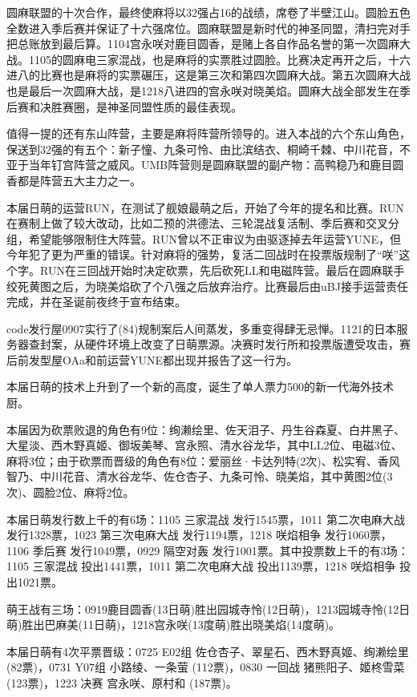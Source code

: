 圆麻联盟的十次合作，最终使麻将以32强占16的战绩，席卷了半壁江山。圆脸五色全数进入季后赛并保证了十六强席位。圆麻联盟是新时代的神圣同盟，清扫完对手把总账放到最后算。1104宫永咲对鹿目圆香，是赌上各自作品名誉的第一次圆麻大战。1105的圆麻电三家混战，也是麻将的实票胜过圆脸。比赛决定再开之后，十六进八的比赛也是麻将的实票碾压，这是第三次和第四次圆麻大战。第五次圆麻大战也是最后一次圆麻大战，是1218八进四的宫永咲对晓美焰。圆麻大战全部发生在季后赛和决胜赛圈，是神圣同盟性质的最佳表现。

值得一提的还有东山阵营，主要是麻将阵营所领导的。进入本战的六个东山角色，保送到32强的有五个：新子憧、九条可怜、由比滨结衣、桐崎千棘、中川花音，不亚于当年钉宫阵营之威风。UMB阵营则是圆麻联盟的副产物：高鸭稳乃和鹿目圆香都是阵营五大主力之一。

本届日萌的运营RUN，在测试了舰娘最萌之后，开始了今年的提名和比赛。RUN在赛制上做了较大改动，比如二预的洪德法、三轮混战复活制、季后赛和交叉分组，希望能够限制住大阵营。RUN曾以不正审议为由驱逐掉去年运营YUNE，但今年犯了更为严重的错误。针对麻将的强势，复活二回战时在投票版规制了“咲”这个字。RUN在三回战开始时决定砍票，先后砍死LL和电磁阵营。最后在圆麻联手绞死黄图之后，为晓美焰砍了个八强之后放弃治疗。比赛最后由uBJ接手运营责任完成，并在圣诞前夜终于宣布结束。

code发行屋0907实行了(84)规制案后人间蒸发，多重变得肆无忌惮。1121的日本服务器查封案，从硬件环境上改变了日萌票源。决赛时发行所和投票版遭受攻击，赛后前发型屋OAa和前运营YUNE都出现并报告了这一行为。

本届日萌的技术上升到了一个新的高度，诞生了单人票力500的新一代海外技术厨。

本届因为砍票败退的角色有9位：绚濑绘里、佐天泪子、丹生谷森夏、白井黑子、大星淡、西木野真姬、御坂美琴、宫永照、清水谷龙华，其中LL2位、电磁3位、麻将3位；由于砍票而晋级的角色有8位：爱丽丝·卡达列特(2次)、松实宥、香风智乃、中川花音、清水谷龙华、佐仓杏子、九条可怜、晓美焰，其中黄图2位(3次)、圆脸2位、麻将2位。

本届日萌发行数上千的有6场：1105 三家混战 发行1545票，1011 第二次电麻大战 发行1328票，1023 第三次电麻大战 发行1194票，1218 咲焰相争 发行1060票，1106 季后赛 发行1049票，0929 隔空对轰 发行1001票。其中投票数上千的有3场：1105 三家混战 投出1441票，1011 第二次电麻大战 投出1139票，1218 咲焰相争 投出1021票。

萌王战有三场：0919鹿目圆香(13日萌)胜出园城寺怜(12日萌)，1213园城寺怜(12日萌)胜出巴麻美(11日萌)，1218宫永咲(13度萌)胜出晓美焰(14度萌)。

本届日萌有4次平票晋级：0725 E02组 佐仓杏子、翠星石、西木野真姬、绚濑绘里 (82票)，0731 Y07组 小路绫、一条萤 (112票)，0830 一回战 猪熊阳子、姬柊雪菜 (123票)，1223 决赛 宫永咲、原村和 (187票)。

